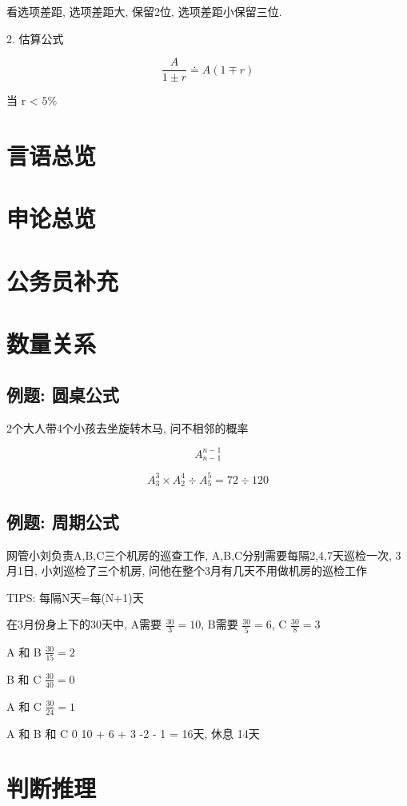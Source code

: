 \documentclass[UTF8]{ctexart}
\begin{document}
看选项差距, 选项差距大, 保留2位, 选项差距小保留三位.

2. 估算公式

$$
	\frac{A}{1\pm r} \doteq A(1 \mp r)
$$

当 r < $5\%$




\section{言语总览}

\section{申论总览}

\section{公务员补充}

\section{数量关系}

\subsection{例题: 圆桌公式}
2个大人带4个小孩去坐旋转木马, 问不相邻的概率

$$
	A^{n-1}_{n-1}
$$

$$
	A^{3}_{3} \times A^{4}_{2} \div A^{5}_{5} = 72 \div 120
$$

\subsection{例题: 周期公式}
网管小刘负责A,B,C三个机房的巡查工作, A,B,C分别需要每隔2,4,7天巡检一次, 3月1日, 小刘巡检了三个机房, 问他在整个3月有几天不用做机房的巡检工作

TIPS: 每隔N天=每(N+1)天

在3月份身上下的30天中, A需要  $\frac{30}{3} = 10$, B需要 $\frac{30}{5} = 6$, C $\frac{30}{8} = 3$

A 和 B $\frac{30}{15} = 2$

B 和 C $\frac{30}{40} = 0$

A 和 C $\frac{30}{24} = 1$

A 和 B 和 C 0
10 + 6 + 3 -2 - 1 = 16天, 休息 14天


\section{判断推理}
\end{document}
